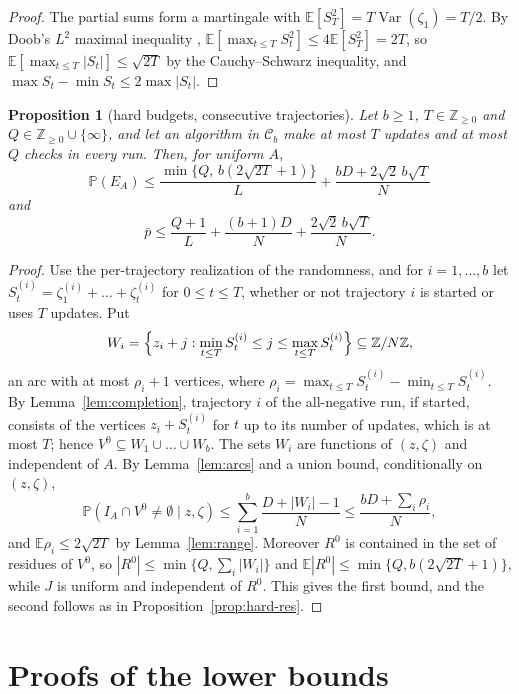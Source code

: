 \documentclass{amsart}
\theoremstyle{plain}
\newtheorem{proposition}[theorem]{Proposition}
\theoremstyle{definition}
\theoremstyle{remark}
\newcommand{\Z}{\mathbb{Z}}
\newcommand{\E}{\mathbb{E}}
\renewcommand{\Pr}{\mathbb{P}}
\newcommand{\con}{\mathcal{C}}
\begin{document}
\begin{proof}
The partial sums form a martingale with $\E[S_T^2]=T\operatorname{Var}(\zeta_1)=T/2$. By Doob's $L^2$ maximal inequality \cite[Chapter~14]{W}, $\E[\max_{t\le T}S_t^2]\le 4\E[S_T^2]=2T$, so $\E[\max_{t\le T}|S_t|]\le\sqrt{2T}$ by the Cauchy--Schwarz inequality, and $\max S_t-\min S_t\le 2\max|S_t|$.
\end{proof}

\begin{proposition}[hard budgets, consecutive trajectories]\label{prop:hard-con}
Let $b\ge 1$, $T\in\Z_{\ge0}$ and $Q\in\Z_{\ge0}\cup\{\infty\}$, and let an algorithm in $\con_b$ make at most $T$ updates and at most $Q$ checks in every run. Then, for uniform $A$,
\[
\Pr(E_A)\le\frac{\min\{Q,\,b(2\sqrt{2T}+1)\}}{L}+\frac{bD+2\sqrt2\,b\sqrt T}{N}
\]
and
\[
\bar p\le\frac{Q+1}{L}+\frac{(b+1)D}{N}+\frac{2\sqrt2\,b\sqrt T}{N}.
\]
\end{proposition}

\begin{proof}
Use the per-trajectory realization of the randomness, and for $i=1,\dots,b$ let $S^{(i)}_t=\zeta^{(i)}_1+\dots+\zeta^{(i)}_t$ for $0\le t\le T$, whether or not trajectory $i$ is started or uses $T$ updates. Put
\[
W_i=\Bigl\{z_i+j: \min_{t\le T}S^{(i)}_t\le j\le\max_{t\le T}S^{(i)}_t\Bigr\}\subseteq\Z/N\Z,
\]
an arc with at most $\rho_i+1$ vertices, where $\rho_i=\max_{t\le T}S^{(i)}_t-\min_{t\le T}S^{(i)}_t$. By Lemma~\ref{lem:completion}, trajectory $i$ of the all-negative run, if started, consists of the vertices $z_i+S^{(i)}_t$ for $t$ up to its number of updates, which is at most $T$; hence $V^0\subseteq W_1\cup\dots\cup W_b$. The sets $W_i$ are functions of $(z,\zeta)$ and independent of $A$. By Lemma~\ref{lem:arcs} and a union bound, conditionally on $(z,\zeta)$,
\[
\Pr(I_A\cap V^0\neq\emptyset\mid z,\zeta)\le\sum_{i=1}^b\frac{D+|W_i|-1}{N}\le\frac{bD+\sum_i\rho_i}{N},
\]
and $\E\rho_i\le 2\sqrt{2T}$ by Lemma~\ref{lem:range}. Moreover $R^0$ is contained in the set of residues of $V^0$, so $|R^0|\le\min\{Q,\sum_i|W_i|\}$ and $\E|R^0|\le\min\{Q,b(2\sqrt{2T}+1)\}$, while $J$ is uniform and independent of $R^0$. This gives the first bound, and the second follows as in Proposition~\ref{prop:hard-res}.
\end{proof}

\section{Proofs of the lower bounds}\label{sec:proofs}
\end{document}
